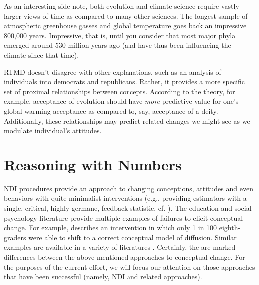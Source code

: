 As an interesting side-note, both evolution and climate science require vastly
larger views of time as compared to many other sciences. The longest sample of
atmospheric greenhouse gasses and global temperature goes back an impressive
800,000 years.  Impressive, that is, until you consider that most major phyla
emerged around 530 million years ago (and have thus been influencing the climate
since that time).


RTMD doesn't disagree with other explanations, such as an analysis of
individuals into democrats and republicans. Rather, it provides a more specific
set of proximal relationships between concepts. According to the theory, for
example, acceptance of evolution should have \emph{more} predictive value for
one's global warming acceptance as compared to, say, acceptance of a deity.
Additionally, these relationships may predict related changes we might see as we
modulate individual's attitudes.



\section{Reasoning with Numbers \label{sec:ndi}}


NDI procedures \cite[introduced by][]{ranney_numerically_2001_fixed} provide an
approach to changing conceptions, attitudes and even behaviors with quite
minimalist interventions (e.g., providing estimators with a single, critical,
highly germane, feedback statistic, cf. ).  The
education and social psychology literature provide multiple examples of failures
to elicit conceptual change. For example, \citeauthor{chi_commonsense_2005} describes
an intervention in which only 1 in 100 eighth-graders were able to shift to a
correct conceptual model of diffusion. Similar examples are available in a
variety of literatures \cite[cf.][]{disessa_what_1998, lord_biased_1979}.
Certainly, the are marked differences between the above mentioned approaches to
conceptual change. For the purposes of the current effort, we will focus our
attention on those approaches that have been successful (namely, NDI and related
approaches).

